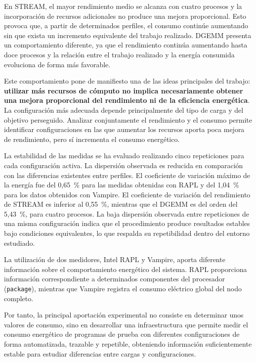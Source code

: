 En STREAM, el mayor rendimiento medio se alcanza con cuatro procesos y la incorporación de recursos adicionales no produce una mejora proporcional. Esto provoca que, a partir de determinados perfiles, el consumo continúe aumentando sin que exista un incremento equivalente del trabajo realizado. DGEMM presenta un comportamiento diferente, ya que el rendimiento continúa aumentando hasta doce procesos y la relación entre el trabajo realizado y la energía consumida evoluciona de forma más favorable.

Este comportamiento pone de manifiesto una de las ideas principales del trabajo: \textbf{utilizar más recursos de cómputo no implica necesariamente obtener una mejora proporcional del rendimiento ni de la eficiencia energética}. La configuración más adecuada depende principalmente del tipo de carga y del objetivo perseguido. Analizar conjuntamente el rendimiento y el consumo permite identificar configuraciones en las que aumentar los recursos aporta poca mejora de rendimiento, pero sí incrementa el consumo energético.

La estabilidad de las medidas se ha evaluado realizando cinco repeticiones  para cada configuración activa. La dispersión observada es reducida en comparación con las diferencias existentes entre perfiles. El coeficiente de variación máximo de la energía fue del 0,65~\% para las medidas obtenidas con RAPL y del 1,04~\% para los datos obtenidos con Vampire. El coeficiente de variación del rendimiento de STREAM es inferior al 0,55~\%, mientras que el DGEMM es del orden del 5,43~\%, para cuatro procesos. La baja dispersión observada entre repeticiones de una misma configuración indica que el procedimiento produce resultados estables bajo condiciones equivalentes, lo que respalda su repetibilidad dentro del entorno estudiado.

La utilización de dos medidores, Intel RAPL y Vampire, aporta diferente información sobre el comportamiento energético del sistema. RAPL proporciona información correspondiente a determinados componentes del procesador (\texttt{package}), mientras que Vampire registra el consumo eléctrico global del nodo completo. 

Por tanto, la principal aportación experimental no consiste en determinar unos  valores de consumo, sino en desarrollar una infraestructura que permite medir el consumo energético de programas de prueba con diferentes configuraciones de forma automatizada, trazable y repetible, obteniendo información suficientemente estable para estudiar diferencias entre cargas y configuraciones.


